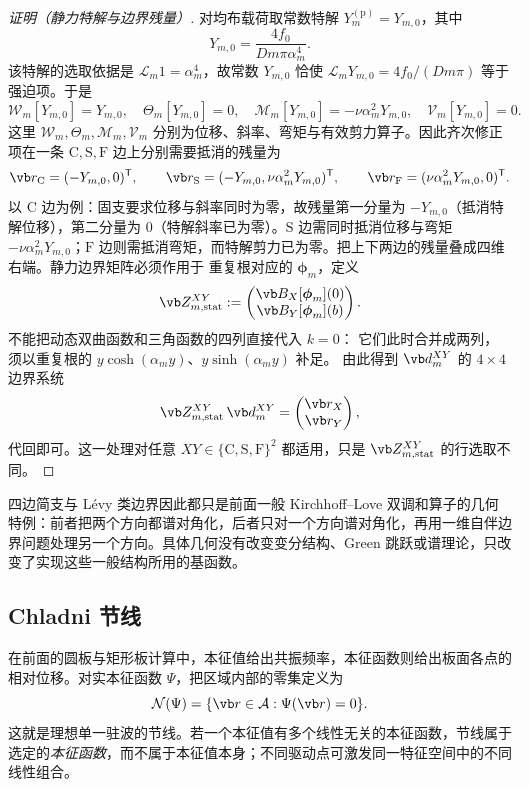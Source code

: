 \begin{proof}[证明（静力特解与边界残量）]
对均布载荷取常数特解 \(Y_m^{(\mathrm p)}=Y_{m,0}\)，其中
\[
 Y_{m,0}=\frac{4f_0}{Dm\pi\alpha_m^4}.
\]
该特解的选取依据是 \(\mathscr L_m1=\alpha_m^4\)，故常数 \(Y_{m,0}\) 恰使 \(\mathscr L_mY_{m,0}=4f_0/(Dm\pi)\) 等于强迫项。于是
\[
\mathcal W_m[Y_{m,0}]=Y_{m,0},
\quad
\Theta_m[Y_{m,0}]=0,
\quad
\mathcal M_m[Y_{m,0}]=-\nu\alpha_m^2Y_{m,0},
\quad
\mathcal V_m[Y_{m,0}]=0.
\]
这里 \(\mathcal W_m,\Theta_m,\mathcal M_m,\mathcal V_m\) 分别为位移、斜率、弯矩与有效剪力算子。因此齐次修正项在一条 \(\mathrm C,\mathrm S,\mathrm F\) 边上分别需要抵消的残量为
\[
\vb r_{\mathrm C}=(-Y_{m,0},0)^{\mathsf T},\qquad
\vb r_{\mathrm S}=(-Y_{m,0},\nu\alpha_m^2Y_{m,0})^{\mathsf T},\qquad
\vb r_{\mathrm F}=(\nu\alpha_m^2Y_{m,0},0)^{\mathsf T}.
\]
以 \(\mathrm C\) 边为例：固支要求位移与斜率同时为零，故残量第一分量为 \(-Y_{m,0}\)（抵消特解位移），第二分量为 \(0\)（特解斜率已为零）。\(\mathrm S\) 边需同时抵消位移与弯矩 \(-\nu\alpha_m^2Y_{m,0}\)；\(\mathrm F\) 边则需抵消弯矩，而特解剪力已为零。把上下两边的残量叠成四维右端。静力边界矩阵必须作用于
重复根对应的 $\boldsymbol\phi_m$，定义
\[
\vb Z_{m,\mathrm{stat}}^{XY}
:=\begin{pmatrix}\vb B_X[\boldsymbol\phi_m](0)\\
\vb B_Y[\boldsymbol\phi_m](b)\end{pmatrix}.
\]
不能把动态双曲函数和三角函数的四列直接代入 $k=0$：
它们此时合并成两列，须以重复根的 $y\cosh(\alpha_my)$、$y\sinh(\alpha_my)$ 补足。
由此得到 \(\vb d_m^{XY}\) 的 \(4\times4\) 边界系统
\[
 \vb Z_{m,\mathrm{stat}}^{XY}\,\vb d_m^{XY}
 =\begin{pmatrix}\vb r_X\\\vb r_Y\end{pmatrix},
\]
代回即可。这一处理对任意 \(XY\in\{\mathrm C,\mathrm S,\mathrm F\}^2\) 都适用，只是 $\vb Z_{m,\mathrm{stat}}^{XY}$ 的行选取不同。
\end{proof}


四边简支与 L\'evy 类边界因此都只是前面一般 Kirchhoff--Love 双调和算子的几何特例：前者把两个方向都谱对角化，后者只对一个方向谱对角化，再用一维自伴边界问题处理另一个方向。具体几何没有改变变分结构、Green 跳跃或谱理论，只改变了实现这些一般结构所用的基函数。
\subsection{Chladni 节线}
\label{sec:phys-sm-chladni-general}

在前面的圆板与矩形板计算中，本征值给出共振频率，本征函数则给出板面各点的相对位移。对实本征函数 \(\Psi\)，把区域内部的零集定义为
\begin{equation}
 \mathcal N(\Psi)=\{\vb r\in\mathcal A:\Psi(\vb r)=0\}.
 \label{eq:phys-sm-chladni-nodal-set}
\end{equation}
这就是理想单一驻波的节线。若一个本征值有多个线性无关的本征函数，节线属于选定的\emph{本征函数}，而不属于本征值本身；不同驱动点可激发同一特征空间中的不同线性组合。

